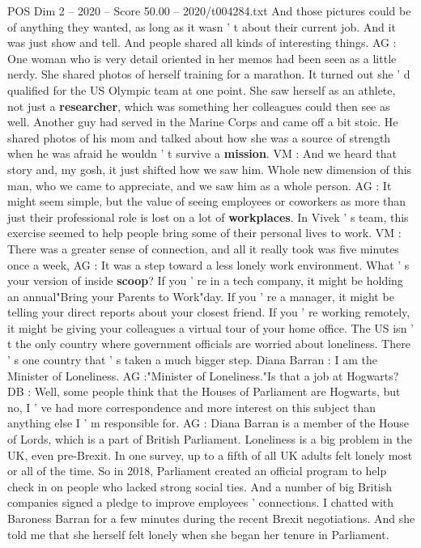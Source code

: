 \begin{textsample}{POS Dim 2 – 2020 – Score 50.00 – 2020/t004284.txt}
And those pictures could be of anything they wanted, as long as it wasn ' t about their current job.
And it was just show and tell.
And people shared all kinds of interesting things.
AG : One woman who is very detail oriented in her memos had been seen as a little nerdy.
She shared photos of herself training for a marathon.
It turned out she ' d qualified for the US Olympic team at one point.
She saw herself as an athlete, not just a \textbf{researcher}, which was something her colleagues could then see as well.
Another guy had served in the Marine Corps and came off a bit stoic.
He shared photos of his mom and talked about how she was a source of strength when he was afraid he wouldn ' t survive a \textbf{mission}.
VM : And we heard that story and, my gosh, it just shifted how we saw him.
Whole new dimension of this man, who we came to appreciate, and we saw him as a whole person.
AG : It might seem simple, but the value of seeing employees or coworkers as more than just their professional role is lost on a lot of \textbf{workplaces}.
In Vivek ' s team, this exercise seemed to help people bring some of their personal lives to work.
VM : There was a greater sense of connection, and all it really took was five minutes once a week, AG : It was a step toward a less lonely work environment.
What ' s your version of inside \textbf{scoop}?
If you ' re in a tech company, it might be holding an annual"Bring your Parents to Work"day.
If you ' re a manager, it might be telling your direct reports about your closest friend.
If you ' re working remotely, it might be giving your colleagues a virtual tour of your home office.
The US isn ' t the only country where government officials are worried about loneliness.
There ' s one country that ' s taken a much bigger step.
Diana Barran : I am the Minister of Loneliness.
AG :"Minister of Loneliness."Is that a job at Hogwarts?
DB : Well, some people think that the Houses of Parliament are Hogwarts, but no, I ' ve had more correspondence and more interest on this subject than anything else I ' m responsible for.
AG : Diana Barran is a member of the House of Lords, which is a part of British Parliament.
Loneliness is a big problem in the UK, even pre-Brexit.
In one survey, up to a fifth of all UK adults felt lonely most or all of the time.
So in 2018, Parliament created an official program to help check in on people who lacked strong social ties.
And a number of big British companies signed a pledge to improve employees ' connections.
I chatted with Baroness Barran for a few minutes during the recent Brexit negotiations.
And she told me that she herself felt lonely when she began her tenure in Parliament.

\end{textsample}
